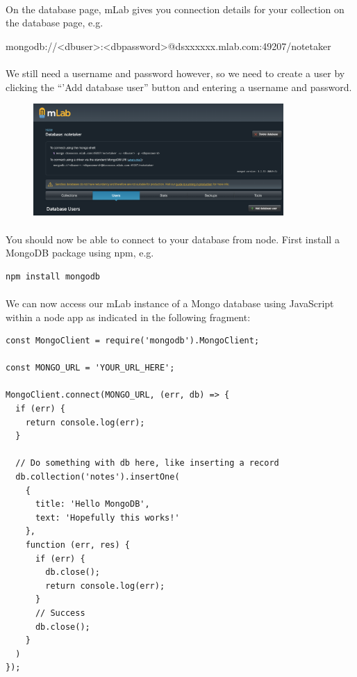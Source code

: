 \documentclass[10pt, a4paper, twosize]{article}
\begin{document}
\paragraph{} On the database page, mLab gives you connection details for your collection on the database page, e.g.

\begin{framed}
    mongodb://<dbuser>:<dbpassword>@dsxxxxxx.mlab.com:49207/notetaker
\end{framed}

\paragraph{} We still need a username and password however, so we need to create a user by clicking the ``'Add database user'' button and entering a username and password.

\begin{figure}[H]
\centering
\includegraphics[width=0.85\textwidth]{images/mlab_dbinfo}
\caption{}
\label{fig:}
\end{figure}

\paragraph{} You should now be able to connect to your database from node. First install a MongoDB package using npm, e.g. 

\begin{lstlisting}[style=DOS]
    npm install mongodb
\end{lstlisting}

\paragraph{} We can now access our mLab instance of a Mongo database using JavaScript within a node app as indicated in the following fragment:

\begin{lstlisting}
const MongoClient = require('mongodb').MongoClient;

const MONGO_URL = 'YOUR_URL_HERE';

MongoClient.connect(MONGO_URL, (err, db) => {  
  if (err) {
    return console.log(err);
  }

  // Do something with db here, like inserting a record
  db.collection('notes').insertOne(
    {
      title: 'Hello MongoDB',
      text: 'Hopefully this works!'
    },
    function (err, res) {
      if (err) {
        db.close();
        return console.log(err);
      }
      // Success
      db.close();
    }
  )
});
\end{lstlisting}
\end{document}

